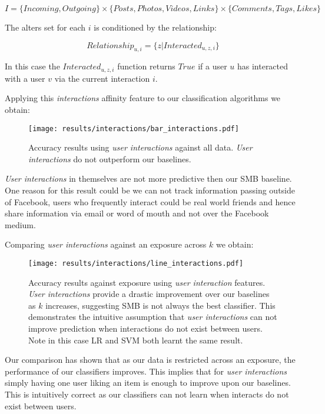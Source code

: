 \[ I = \{Incoming, Outgoing\} \times \{Posts,Photos,Videos,Links\} \times \{Comments,Tags,Likes\} \]

The alters set for each $i$ is conditioned by the relationship:

\[ Relationship_{u,i} = \{z | Interacted_{u,z,i}\} \]

In this case the $Interacted_{u,z,i}$ function returns $True$ if a user $u$ has interacted with a user $v$ via the current interaction $i$.

Applying this \emph{interactions} affinity feature to our classification algorithms we obtain:

\begin{figure}[tbh!]
	\begin{center}
		\texttt{[image: results/interactions/bar\_interactions.pdf]}
		\caption{Accuracy results using \emph{user interactions} against all data. \emph{User interactions} do not outperform our baselines.}
	\end{center}
\end{figure}

\emph{User interactions} in themselves are not more predictive then our SMB baseline. One reason for this result could be we can 
not track information passing outside of Facebook, users who frequently interact could be real world friends and hence share 
information via email or word of mouth and not over the Facebook medium.

\clearpage

Comparing \emph{user interactions} against an exposure across $k$ we obtain:

\begin{figure}[tbh!]
	\begin{center}
		\texttt{[image: results/interactions/line\_interactions.pdf]}
		\caption{Accuracy results against exposure using \emph{user interaction} features. \emph{User interactions} provide a drastic improvement 
		over our baselines as $k$ increases, suggesting SMB is not always the best classifier. 
		This demonstrates the intuitive assumption that \emph{user interactions} can not improve prediction when interactions do not exist between users.
		Note in this case LR and SVM both learnt the same result.}
	\end{center}
\end{figure}

Our comparison has shown that as our data is restricted across an exposure, the performance of our classifiers improves.
This implies that for \emph{user interactions} simply having one user liking an item is enough to improve upon our baselines. 
This is intuitively correct as our classifiers can not learn when interacts do not exist between users.


